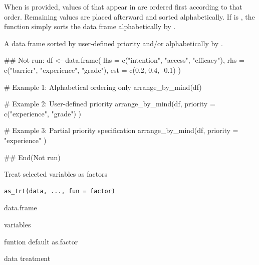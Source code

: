 \documentclass[a4paper]{book}
\begin{document}
%
\begin{Details}
When  is provided, values of  that appear in
 are ordered first according to that order. Remaining
values are placed afterward and sorted alphabetically.
If  is , the function simply sorts the data
frame alphabetically by .
\end{Details}
%
\begin{Value}
A data frame sorted by user-defined priority and/or
alphabetically by .
\end{Value}
%
\begin{Examples}
\begin{ExampleCode}
## Not run: 
df <- data.frame(
  lhs = c("intention", "access", "efficacy"),
  rhs = c("barrier", "experience", "grade"),
  est = c(0.2, 0.4, -0.1)
)

# Example 1: Alphabetical ordering only
arrange_by_mind(df)

# Example 2: User-defined priority
arrange_by_mind(df,
  priority = c("experience", "grade")
)

# Example 3: Partial priority specification
arrange_by_mind(df,
  priority = "experience"
)

## End(Not run)
\end{ExampleCode}
\end{Examples}
%
\begin{Description}
Treat selected variables as factors
\end{Description}
%
\begin{Usage}
\begin{verbatim}
as_trt(data, ..., fun = factor)
\end{verbatim}
\end{Usage}
%
\begin{Arguments}
\begin{ldescription}
\item[\code{data}] data.frame

\item[\code{...}] variables

\item[\code{fun}] funtion default as.factor
\end{ldescription}
\end{Arguments}
%
\begin{Value}
data treatment
\end{Value}
%
\end{document}
